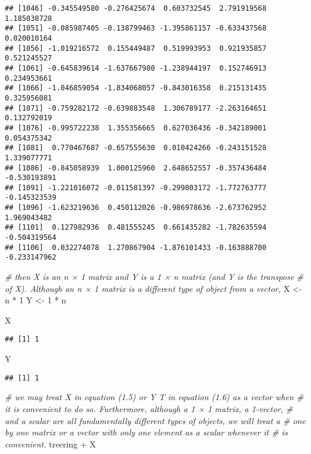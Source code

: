 \documentclass[
]{article}
\newenvironment{Shaded}{\begin{snugshade}}{\end{snugshade}}
\newcommand{\CommentTok}[1]{\textcolor[rgb]{0.56,0.35,0.01}{\textit{#1}}}
\newcommand{\DecValTok}[1]{\textcolor[rgb]{0.00,0.00,0.81}{#1}}
\newcommand{\NormalTok}[1]{#1}
\newcommand{\OtherTok}[1]{\textcolor[rgb]{0.56,0.35,0.01}{#1}}
\newcommand{\SpecialCharTok}[1]{\textcolor[rgb]{0.00,0.00,0.00}{#1}}
\begin{document}
\begin{verbatim}
## [1046] -0.345549580 -0.276425674  0.603732545  2.791919568  1.185038728
## [1051] -0.085987405 -0.138799463 -1.395861157 -0.633437568  0.020010164
## [1056] -1.019216572  0.155449487  0.519993953  0.921935857  0.521245527
## [1061] -0.645839614 -1.637667980 -1.238944197  0.152746913  0.234953661
## [1066] -1.046859054 -1.834068057 -0.843016358  0.215131435  0.325956081
## [1071] -0.759282172 -0.639883548  1.306789177 -2.263164651  0.132792019
## [1076] -0.995722238  1.355356665  0.627036436 -0.342189001  0.054375342
## [1081]  0.770467687 -0.657555630  0.010424266 -0.243151528  1.339077771
## [1086] -0.845058939  1.000125960  2.648652557 -0.357436484 -0.530193891
## [1091] -1.221016072 -0.011581397 -0.299803172 -1.772763777 -0.145323539
## [1096] -1.623219636  0.450112026 -0.986978636 -2.673762952  1.969043482
## [1101]  0.127982936  0.481555245  0.661435282 -1.782635594 -0.504319564
## [1106]  0.032274078  1.270867904 -1.876101433 -0.163888700 -0.233147962
\end{verbatim}

\begin{Shaded}
\begin{Highlighting}[]
\CommentTok{\# then X is an n × 1 matrix and Y is a 1 × n matrix (and Y is the transpose}
\CommentTok{\# of X). Although an n × 1 matrix is a different type of object from a vector,}
\NormalTok{X }\OtherTok{\textless{}{-}}\NormalTok{ n }\SpecialCharTok{*} \DecValTok{1}
\NormalTok{Y }\OtherTok{\textless{}{-}} \DecValTok{1} \SpecialCharTok{*}\NormalTok{ n}

\NormalTok{X}
\end{Highlighting}
\end{Shaded}

\begin{verbatim}
## [1] 1
\end{verbatim}

\begin{Shaded}
\begin{Highlighting}[]
\NormalTok{Y}
\end{Highlighting}
\end{Shaded}

\begin{verbatim}
## [1] 1
\end{verbatim}

\begin{Shaded}
\begin{Highlighting}[]
\CommentTok{\# we may treat X in equation (1.5) or Y T in equation (1.6) as a vector when}
\CommentTok{\# it is convenient to do so. Furthermore, although a 1 × 1 matrix, a 1{-}vector,}
\CommentTok{\# and a scalar are all fundamentally diﬀerent types of objects, we will treat a}
\CommentTok{\# one by one matrix or a vector with only one element as a scalar whenever it}
\CommentTok{\# is convenient.}
\NormalTok{treering }\SpecialCharTok{+}\NormalTok{ X}
\end{Highlighting}
\end{Shaded}
\end{document}
